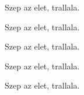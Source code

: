 \documentclass[12pt]{article}
\begin{document}
Szep az elet, trallala.

Szep az elet, trallala.

Szep az elet, trallala.

Szep az elet, trallala.

Szep az elet, trallala.
\end{document}
